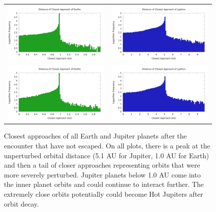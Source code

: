 \documentclass[12pt]{article}
\begin{document}
    \begin{figure}[H]
        \centering
        \caption{Closest approaches of all Earth and Jupiter planets after 
            the encounter that have not escaped. On all plots, there is a peak
            at the unperturbed orbital distance (5.1 AU for Jupiter, 1.0 AU for
            Earth) and then a tail of closer approaches representing
            orbits that were more severely perturbed. Jupiter planets below 1.0 AU
            come into the inner planet orbits and could continue to interact further.
            The extremely close orbits potentially could become Hot Jupiters after
            orbit decay.
        }
        \label{fig:periastron}
        \begin{tabular}{cc}
            \includegraphics[width=3.25in]{periastron_earth_1000} &
            \includegraphics[width=3.25in]{periastron_jupiter_1000} \\

            \includegraphics[width=3.25in]{periastron_earth_4000} &
            \includegraphics[width=3.25in]{periastron_jupiter_4000} \\
        \end{tabular}
    \end{figure}
\end{document}
